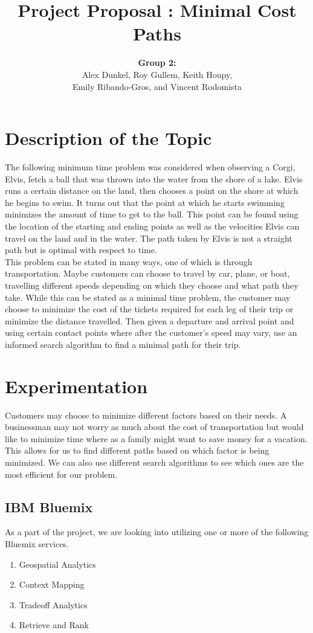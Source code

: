 \documentclass[11pt]{article}
\title{Project Proposal : Minimal Cost Paths}
\author{ {\bf Group 2:} \\
Alex Dunkel,
Roy Gullem,
Keith Houpy, \\
Emily Ribando-Gros, and
Vincent Rodomista}
\begin{document}
\maketitle
				
\section{Description of the Topic}

\indent The following minimum time problem was considered when observing a Corgi, Elvis, fetch a ball that was thrown into the water from the shore of a lake. Elvis runs a certain distance on the land, then chooses a point on the shore at which he begins to swim. It turns out that the point at which he starts swimming minimizes the amount of time to get to the ball. This point can be found using the location of the starting and ending points as well as the velocities Elvis can travel on the land and in the water. The path taken by Elvis is not a straight path but is optimal with respect to time.
\\
\indent This problem can be stated in many ways, one of which is through transportation. Maybe customers can choose to travel by car, plane, or boat, travelling different speeds depending on which they choose and what path they take. While this can be stated as a minimal time problem, the customer may choose to minimize the cost of the tickets required for each leg of their trip or minimize the distance travelled. Then given a departure and arrival point and using certain contact points where after the customer's speed may vary, use an informed search algorithm to find a minimal path for their trip.
\\

\section{Experimentation}

\indent Customers may choose to minimize different factors based on their needs. A businessman may not worry as much about the cost of transportation but would like to minimize time where as a family might want to save money for a vacation. This allows for us to find different paths based on which factor is being minimized. We can also use different search algorithms to see which ones are the most efficient for our problem. 

\subsection{IBM Bluemix}

As a part of the project, we are looking into utilizing one or more of the following Bluemix services.

\begin{enumerate}
	\item Geospatial Analytics
	\item Context Mapping
	\item Tradeoff Analytics
	\item Retrieve and Rank
\end{enumerate}
\end{document}
